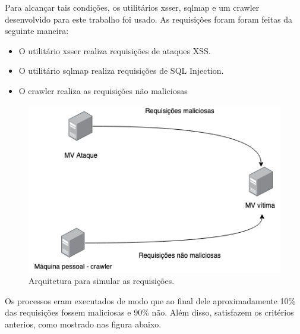 Para alcançar tais condições, os utilitários xsser, sqlmap e um crawler desenvolvido para 
este trabalho foi usado. As requisições foram foram feitas da seguinte maneira:

\begin{itemize}
    \item O utilitário xsser realiza requisições de ataques XSS.
    \item O utilitário sqlmap realiza requisições de SQL Injection.
    \item O crawler realiza as requisições não maliciosas
\end{itemize}

\begin{figure}
    \centering
    \includegraphics[width=.7\textwidth]{figuras/arquitetura_ataque.png}
    \caption{Arquitetura para simular as requisições. \label{fig:arquitetura_ataque}}    
\end{figure}

Os processos eram executados de modo que ao final dele aproximadamente 10\% das requisições 
fossem maliciosas e 90\% não. Além disso, satisfazem os critérios anterios, como mostrado 
nas figura abaixo.

